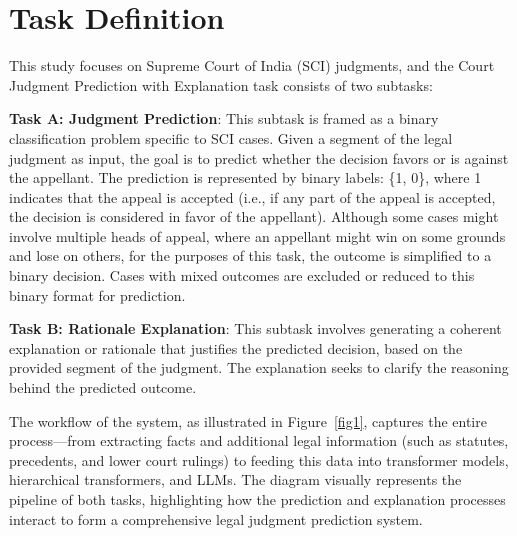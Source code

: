 \section{Task Definition}
This study focuses on Supreme Court of India (SCI) judgments, and the Court Judgment Prediction with Explanation task consists of two subtasks:

\textbf{Task A: Judgment Prediction}: This subtask is framed as a binary classification problem specific to SCI cases. Given a segment of the legal judgment as input, the goal is to predict whether the decision favors or is against the appellant. The prediction is represented by binary labels: \{1, 0\}, where 1 indicates that the appeal is accepted (i.e., if any part of the appeal is accepted, the decision is considered in favor of the appellant). Although some cases might involve multiple heads of appeal, where an appellant might win on some grounds and lose on others, for the purposes of this task, the outcome is simplified to a binary decision. Cases with mixed outcomes are excluded or reduced to this binary format for prediction.

\textbf{Task B: Rationale Explanation}: This subtask involves generating a coherent explanation or rationale that justifies the predicted decision, based on the provided segment of the judgment. The explanation seeks to clarify the reasoning behind the predicted outcome.
 
The workflow of the system, as illustrated in Figure~\ref{fig1}, captures the entire process—from extracting facts and additional legal information (such as statutes, precedents, and lower court rulings) to feeding this data into transformer models, hierarchical transformers, and LLMs. The diagram visually represents the pipeline of both tasks, highlighting how the prediction and explanation processes interact to form a comprehensive legal judgment prediction system.

